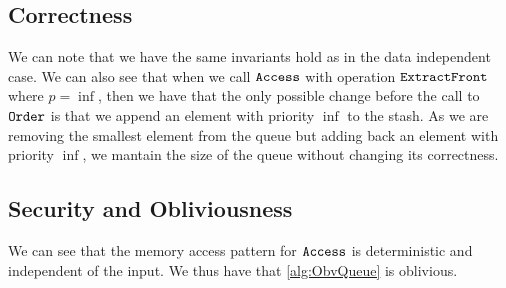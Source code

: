 \subsection{Correctness}
We can note that we have the same invariants hold as in the data independent case.
We can also see that when we call $\texttt{Access}$ with operation $\texttt{ExtractFront}$ where $p = \inf$,
then we have that the only possible change before the call to $\texttt{Order}$ is that we append an element with priority $\inf$ to the stash.
As we are removing the smallest element from the queue but adding back an element with priority $\inf$,
we mantain the size of the queue without changing its correctness.

\subsection{Security and Obliviousness}
We can see that the memory access pattern for $\texttt{Access}$ is deterministic and independent of the input.
We thus have that \cref{alg:ObvQueue} is oblivious.
	